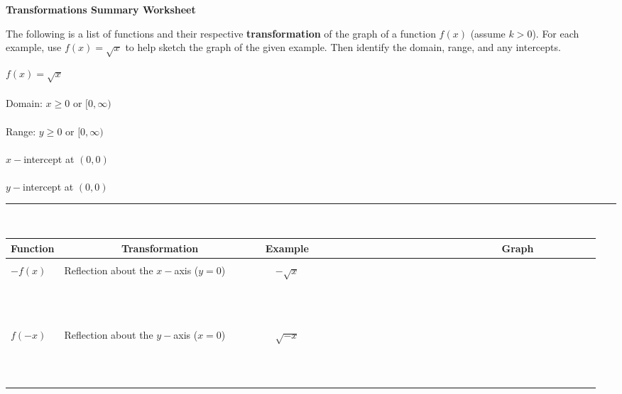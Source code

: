 \documentclass[12pt]{article}
\theoremstyle{definition}
\begin{document}
\begin{center}
{\bf Transformations Summary Worksheet}
\end{center}

\noindent The following is a list of functions and their respective {\bf transformation} of the graph of a function $f(x)$ (assume $k>0$).  For each example, use $f(x)=\sqrt{x}$ to help sketch the graph of the given example.  Then identify the domain, range, and any intercepts.\\
\begin{multicols}{2}
$f(x)=\sqrt{x}$\\
~\\
Domain: $x\geq 0$ or $[0,\infty)$\\
~\\
Range: $y\geq 0$ or $[0,\infty)$\\
~\\
$x-$intercept at $(0,0)$\\
~\\
$y-$intercept at $(0,0)$\\

\end{multicols}
\hrule
~\\
\begin{tabular}{llll}
Function & ~~~~~~~~~~Transformation~~~~~~~~~~ & Example & ~~~~~~~~~~~~~~~~~~~~~~~~~~~~~~~~Graph~~~~~~~~~~\\
\hline
\\
$-f(x)$ & Reflection about the $x-$axis ($y=0$) & ~~$-\sqrt{x}$ &\\
\\
&&&\\
&&&\\
&&&\\
&&&\\
&&&\\
&&&\\
&&&\\
&&&\\
&&&\\
&&&\\
&&&\\
$f(-x)$ & Reflection about the $y-$axis ($x=0$) & ~~$\sqrt{-x}$ &\\
\\
&&&\\
&&&\\
&&&\\
&&&\\
&&&\\
&&&\\
&&&\\
&&&\\
&&&\\
&&&\\
\end{tabular}
\end{document}
